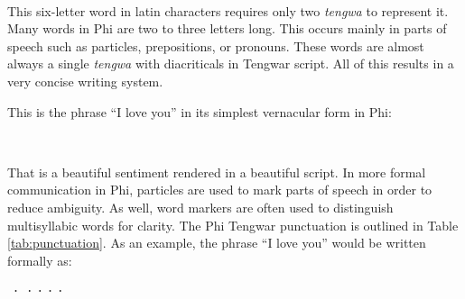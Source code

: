 \bigskip
\leftskip=0.66in
\ttl 
\normalfont
\bigskip

\leftskip=0in
This six-letter word in latin characters requires only two \emph{tengwa} to represent it. Many words in Phi are two to three letters long. This occurs mainly in parts of speech such as particles, prepositions, or pronouns. These words are almost always a single \emph{tengwa} with diacriticals in Tengwar script. All of this results in a very concise writing system.

This is the phrase “I love you” in its simplest vernacular form in Phi:

\bigskip
\leftskip=0.66in
\ttl 
\normalfont
\bigskip

\leftskip=0in
That is a beautiful sentiment rendered in a beautiful script. In more formal communication in Phi, particles are used to mark parts of speech in order to reduce ambiguity. As well, word markers are often used to distinguish multisyllabic words for clarity. The Phi Tengwar punctuation is outlined in Table \ref{tab:punctuation}. As an example, the phrase “I love you” would be written formally as:

\bigskip
\leftskip=0.66in
\ttl ⸱⸱⸱⸱⸱
\normalfont
\bigskip

